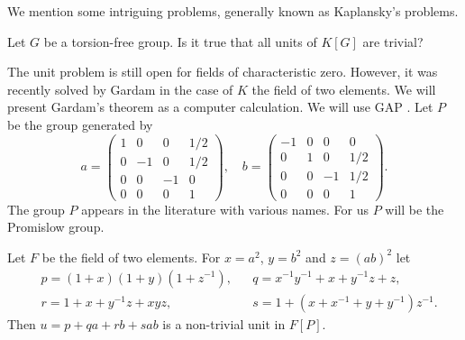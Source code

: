 We mention some intriguing problems, generally known as Kaplansky's problems. 

\begin{problem}[Units]
	\label{prob:units}
	Let $G$ be a torsion-free group. Is it true that all units of $K[G]$ are
	trivial?
\end{problem}

The unit problem is still open for fields of characteristic zero. 
However, it was recently solved by Gardam \cite{MR4334981} 
in the case of 
$K$ the field of two elements. We will present Gardam's theorem 
as a computer calculation. We will use \textsf{GAP} \cite{GAP4}.  
Let $P$ be the group
generated by
\[
a=\begin{pmatrix}
1 & 0 & 0 & 1/2\\
0 & -1 & 0 & 1/2\\
0 & 0 & -1 & 0\\
0 & 0 & 0 & 1
\end{pmatrix},
\quad
b=\begin{pmatrix}
-1 & 0 & 0 & 0\\
0 & 1 & 0 & 1/2\\
0 & 0 & -1 & 1/2\\
0 & 0 & 0 & 1
\end{pmatrix}. 
\]
The group $P$ appears in the literature with various names. 
For us $P$ will be the Promislow group. 

\begin{theorem}[Gardam]
\label{thm:Gardam}
    Let $F$ be the field of two elements. For 
    $x=a^2$, $y=b^2$ and $z=(ab)^2$ let 
    \begin{align*}
        &p=(1+x)(1+y)(1+z^{-1}), 
        &&q = x^{-1}y^{-1}+x+y^{-1}z+z,\\
        &r = 1+x+y^{-1}z+xyz,
        &&s=1+(x+x^{-1}+y+y^{-1})z^{-1}.
    \end{align*}
    Then $u=p+qa+rb+sab$ is a non-trivial unit in $F[P]$. 
\end{theorem}

